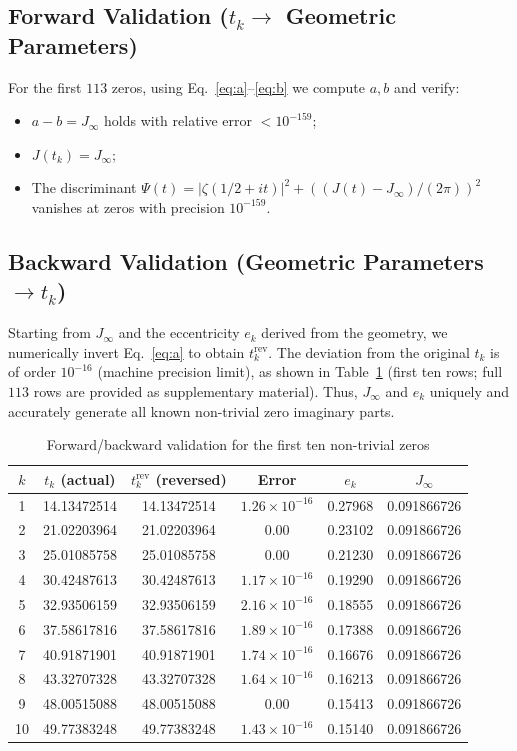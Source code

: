 \documentclass[12pt,a4paper]{article}
\begin{document}
\subsection{Forward Validation ($t_k \to$ Geometric Parameters)}\label{subsec:forward}
For the first $113$ zeros, using Eq.~\eqref{eq:a}--\eqref{eq:b} we compute $a,b$ and verify:
\begin{itemize}
\item $a-b = J_\infty$ holds with relative error $<10^{-159}$;
\item $J(t_k) = J_\infty$;
\item The discriminant $\Psi(t) = |\zeta(1/2+it)|^2 + ((J(t)-J_\infty)/(2\pi))^2$ vanishes at zeros with precision $10^{-159}$.
\end{itemize}

\subsection{Backward Validation (Geometric Parameters $\to t_k$)}\label{subsec:backward}
Starting from $J_\infty$ and the eccentricity $e_k$ derived from the geometry, we numerically invert Eq.~\eqref{eq:a} to obtain $t_k^{\text{rev}}$. The deviation from the original $t_k$ is of order $10^{-16}$ (machine precision limit), as shown in Table~\ref{tab:zeros} (first ten rows; full $113$ rows are provided as supplementary material). Thus, $J_\infty$ and $e_k$ uniquely and accurately generate all known non-trivial zero imaginary parts.

\begin{table}[htbp]
\centering
\caption{Forward/backward validation for the first ten non-trivial zeros}
\label{tab:zeros}
\begin{tabular}{cccccc}
\toprule
$k$ & $t_k$ (actual) & $t_k^{\mathrm{rev}}$ (reversed) & Error & $e_k$ & $J_\infty$ \\
\midrule
1 & 14.13472514 & 14.13472514 & $1.26\times10^{-16}$ & 0.27968 & 0.091866726 \\
2 & 21.02203964 & 21.02203964 & $0.00$ & 0.23102 & 0.091866726 \\
3 & 25.01085758 & 25.01085758 & $0.00$ & 0.21230 & 0.091866726 \\
4 & 30.42487613 & 30.42487613 & $1.17\times10^{-16}$ & 0.19290 & 0.091866726 \\
5 & 32.93506159 & 32.93506159 & $2.16\times10^{-16}$ & 0.18555 & 0.091866726 \\
6 & 37.58617816 & 37.58617816 & $1.89\times10^{-16}$ & 0.17388 & 0.091866726 \\
7 & 40.91871901 & 40.91871901 & $1.74\times10^{-16}$ & 0.16676 & 0.091866726 \\
8 & 43.32707328 & 43.32707328 & $1.64\times10^{-16}$ & 0.16213 & 0.091866726 \\
9 & 48.00515088 & 48.00515088 & $0.00$ & 0.15413 & 0.091866726 \\
10 & 49.77383248 & 49.77383248 & $1.43\times10^{-16}$ & 0.15140 & 0.091866726 \\
\bottomrule
\end{tabular}
\end{table}
\end{document}
